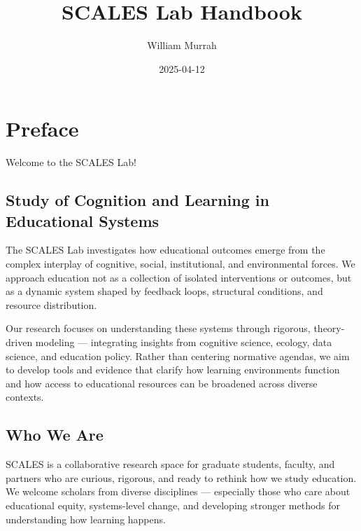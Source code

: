 \documentclass[
  letterpaper,
  DIV=11,
  numbers=noendperiod]{scrreprt}
\title{SCALES Lab Handbook}
\author{William Murrah}
\date{2025-04-12}
\renewcommand*\contentsname{Table of contents}
\newcommand\contentsname{Table of contents}
\begin{document}
\maketitle

\renewcommand*\contentsname{Table of contents}
{
\hypersetup{linkcolor=}
\setcounter{tocdepth}{2}
\tableofcontents
}


\chapter*{Preface}\label{preface}


Welcome to the SCALES Lab!

\section*{Study of Cognition and Learning in Educational
Systems}\label{study-of-cognition-and-learning-in-educational-systems}


The SCALES Lab investigates how educational outcomes emerge from the
complex interplay of cognitive, social, institutional, and environmental
forces. We approach education not as a collection of isolated
interventions or outcomes, but as a dynamic system shaped by feedback
loops, structural conditions, and resource distribution.

Our research focuses on understanding these systems through rigorous,
theory-driven modeling --- integrating insights from cognitive science,
ecology, data science, and education policy. Rather than centering
normative agendas, we aim to develop tools and evidence that clarify how
learning environments function and how access to educational resources
can be broadened across diverse contexts.

\section*{Who We Are}\label{who-we-are}


SCALES is a collaborative research space for graduate students, faculty,
and partners who are curious, rigorous, and ready to rethink how we
study education. We welcome scholars from diverse disciplines ---
especially those who care about educational equity, systems-level
change, and developing stronger methods for understanding how learning
happens.
\end{document}
